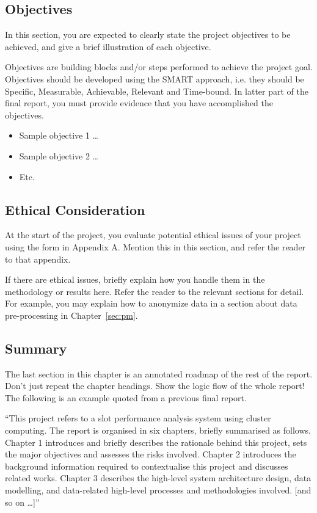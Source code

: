 \documentclass[11pt,a4paper]{article}
\begin{document}
\subsection{Objectives}

In this section, you are expected to clearly state the project objectives to be achieved, and give a brief illustration of each objective.

Objectives are building blocks and/or steps performed to achieve the project goal. Objectives should be developed using the SMART approach, i.e. they should be Specific, Measurable, Achievable, Relevant and Time-bound. In latter part of the final report, you must provide evidence that you have accomplished the objectives.
\begin{itemize}
  \item Sample objective 1 \ldots
  \item Sample objective 2 \ldots
  \item Etc.
\end{itemize}

\subsection{Ethical Consideration}

At the start of the project, you evaluate potential ethical issues of your project using the form in Appendix A. Mention this in this section, and refer the reader to that appendix.

If there are ethical issues, briefly explain how you handle them in the methodology or results here. Refer the reader to the relevant sections for detail. For example, you may explain how to anonymize data in a section about data pre-processing in Chapter~\ref{sec:pm}.

\subsection{Summary}

The last section in this chapter is an annotated roadmap of the rest of the report. Don't just repeat the chapter headings. Show the logic flow of the whole report! The following is an example quoted from a previous final report.

``This project refers to a slot performance analysis system using cluster computing. The report is organised in six chapters, briefly summarised as follows. Chapter 1 introduces and briefly describes the rationale behind this project, sets the major objectives and assesses the risks involved. Chapter 2 introduces the background information required to contextualise this project and discusses related works. Chapter 3 describes the high-level system architecture design, data modelling, and data-related high-level processes and methodologies involved. [and so on \ldots]''
\end{document}
